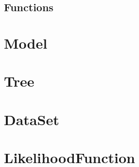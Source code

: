 \documentclass[12pt]{book}
\begin{document}
\section {Functions}




\chapter {Model}


\chapter {Tree}


\chapter {DataSet}

\chapter {LikelihoodFunction}
\end{document}
